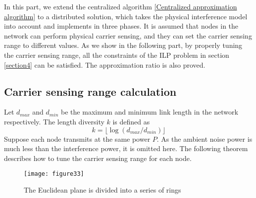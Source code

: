 \documentclass[conference]{IEEEtran}
\begin{document}
In this part,  we extend the centralized algorithm \ref{Centralized
approximation algorithm} to a distributed solution, which takes the
physical interference model into account and implements in three
phases. It is assumed that nodes in the network can perform physical
carrier sensing, and they can set the carrier sensing range to
different values. As we show in the following part, by properly
tuning the carrier sensing range, all the constraints of the ILP
problem in section \ref{section4} can be satisfied. The
approximation ratio is also proved.

\subsection{Carrier sensing range calculation}
Let $d_{max}$ and $d_{min}$ be the maximum and minimum link length
in the network respectively. The length diversity $k$ is defined as
\begin{equation}\label{diversity}
k=\lfloor \log{(d_{max}/d_{min})} \rfloor
\end{equation}
Suppose each node transmits at the same power $P$. As the ambient
noise power is much less than the interference power, it is omitted
here. The following theorem describes how to tune the carrier
sensing range for each node.
\begin{figure}[!h]
\centering
\texttt{[image: figure33]}
\caption{The Euclidean plane is divided into a series of rings}
\label{Fig:the Euclidean plane is divided into a series of rings}
\end{figure}
\end{document}
